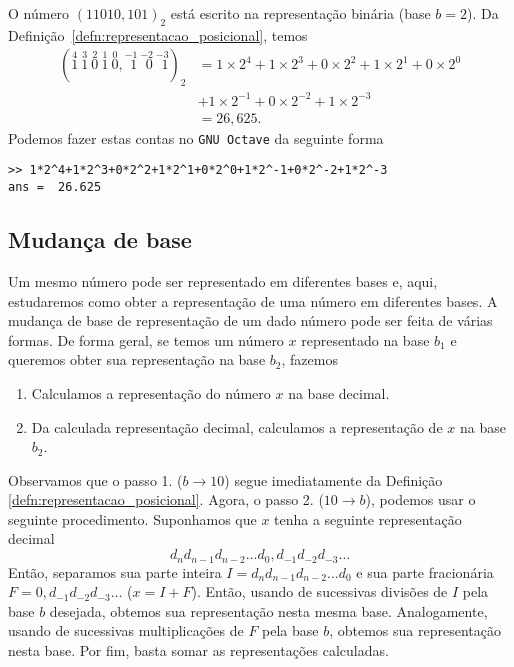 \begin{ex}\label{ex:base_binaria}
  O número $(11010,101)_2$ está escrito na representação binária (base $b=2$). Da Definição~\ref{defn:representacao_posicional}, temos
  \begin{align}
    (\stackrel{4}{1}~\stackrel{3}{1}~\stackrel{2}{0}~\stackrel{1}{1}~\stackrel{0}{0},\stackrel{-1}{~\,1}~\stackrel{-2}{~\,0}~\stackrel{-3}{~\,1})_2 &= 1\times 2^4 + 1\times 2^3 + 0\times 2^2 + 1\times 2^1 + 0\times 2^0\\
    &+ 1\times 2^{-1} + 0\times 2^{-2} + 1\times 2^{-3}\\
    &= 26,625.
  \end{align}
\ifisoctave
Podemos fazer estas contas no \verb+GNU Octave+ da seguinte forma
\begin{verbatim}
>> 1*2^4+1*2^3+0*2^2+1*2^1+0*2^0+1*2^-1+0*2^-2+1*2^-3
ans =  26.625
\end{verbatim}
\fi
\end{ex}

\subsection{Mudança de base}

Um mesmo número pode ser representado em diferentes bases e, aqui, estudaremos como obter a representação de uma número em diferentes bases. A mudança de base de representação de um dado número pode ser feita de várias formas. De forma geral, se temos um número $x$ representado na base $b_1$ e queremos obter sua representação na base $b_2$, fazemos
\begin{enumerate}
\item Calculamos a representação do número $x$ na base decimal.
\item Da calculada representação decimal, calculamos a representação de $x$ na base $b_2$.
\end{enumerate}
Observamos que o passo 1. ($b \to 10$) segue imediatamente da Definição \ref{defn:representacao_posicional}. Agora, o passo 2. ($10\to b$), podemos usar o seguinte procedimento. Suponhamos que $x$ tenha a seguinte representação decimal
\begin{equation}
  d_nd_{n-1}d_{n-2}\ldots d_0,d_{-1}d_{-2}d_{-3}\ldots
\end{equation}
Então, separamos sua parte inteira $I = d_nd_{n-1}d_{n-2}\ldots d_0$ e sua parte fracionária $F = 0,d_{-1}d_{-2}d_{-3}\ldots$ ($x = I + F$). Então, usando de sucessivas divisões de $I$ pela base $b$ desejada, obtemos sua representação nesta mesma base. Analogamente, usando de sucessivas multiplicações de $F$ pela base $b$, obtemos sua representação nesta base. Por fim, basta somar as representações calculadas.

